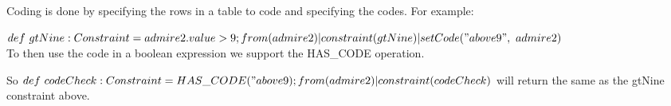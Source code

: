 Coding is done by specifying the rows in a table to code and specifying the codes. For example:

$def\ gtNine : Constraint = admire2.value > 9; \\
from(admire2)|constraint(gtNine)|setCode("above9",\ admire2)$
\\

To then use the code in a boolean expression we support the HAS\_CODE operation.

So $def\ codeCheck : Constraint = HAS\_CODE("above9); \\
from(admire2)|constraint(codeCheck)$ will return the same as the gtNine constraint above.